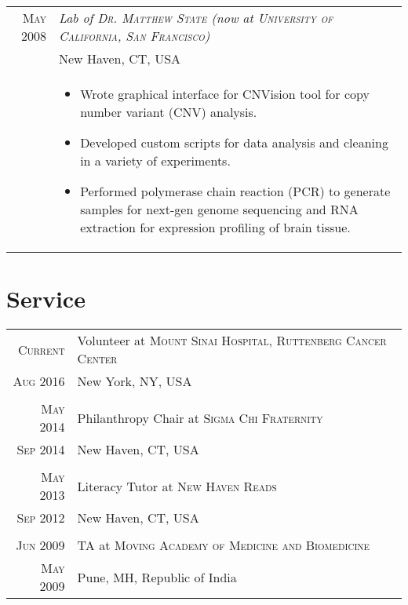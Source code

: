 \documentclass[a4paper,10pt]{article}
\begin{document}
\begin{longtable}{r|p{11cm}}
 \nopagebreak \textsc{May 2008} & \small\emph{Lab of \textsc{Dr. Matthew State} (now at \textsc{University of California, San Francisco})} \\
 \nopagebreak & \small{New Haven, CT, USA} \\
 \nopagebreak & \footnotesize{
	\begin{itemize}
		\item[]{
			Wrote graphical interface for CNVision tool for copy number variant (CNV) analysis.
		}
		\item[]{
			Developed custom scripts for data analysis and cleaning in a variety of experiments.
		}
		\item[]{
			Performed polymerase chain reaction (PCR) to generate samples for next-gen
			genome sequencing and RNA extraction for expression profiling of
			brain tissue.
		}
	\end{itemize}
   }\\
\end{longtable}

\section{Service}
\begin{longtable}{r|p{11cm}}
 \nopagebreak \textsc{Current} & Volunteer at \textsc{Mount Sinai Hospital, Ruttenberg Cancer Center} \\
 \nopagebreak \textsc{Aug 2016} &  \small{New York, NY, USA}\\
 \multicolumn{2}{c}{} \\
 \nopagebreak \textsc{May 2014} & Philanthropy Chair at \textsc{Sigma Chi Fraternity}\\
 \nopagebreak \textsc{Sep 2014} & \small{New Haven, CT, USA} \\
 \multicolumn{2}{c}{} \\
 \nopagebreak \textsc{May 2013} & Literacy Tutor at \textsc{New Haven Reads}\\
 \nopagebreak \textsc{Sep 2012} & \small{New Haven, CT, USA} \\
 \multicolumn{2}{c}{} \\
 \nopagebreak \textsc{Jun 2009} & TA at \textsc{Moving Academy of Medicine and Biomedicine} \\
 \nopagebreak \textsc{May 2009} & \small{Pune, MH, Republic of India} \\
\end{longtable}

\end{document}
